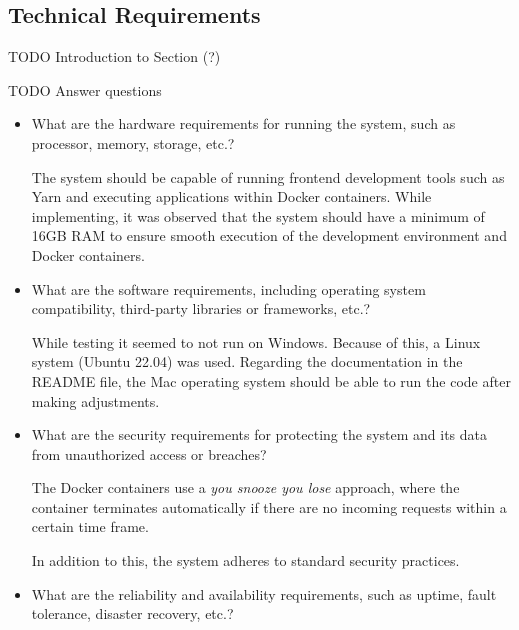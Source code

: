 \documentclass[../MasterThesis.tex]{subfiles}
\begin{document}
\subsection{Technical Requirements} \label{subsection:technicalrequirements}


TODO Introduction to Section (?)

TODO Answer questions

\begin{itemize}

\item What are the hardware requirements for running the system, such as processor, memory, storage, etc.?

The system should be capable of running frontend development tools such as Yarn and executing applications within Docker containers.
While implementing, it was observed that the system should have a minimum of 16GB RAM to ensure smooth execution of the development environment and Docker containers.



\item What are the software requirements, including operating system compatibility, third-party libraries or frameworks, etc.?

While testing it seemed to not run on Windows. Because of this, a Linux system (Ubuntu 22.04) was used. Regarding the documentation in the README file, the Mac operating system should be able to run the code after making adjustments.



\item What are the security requirements for protecting the system and its data from unauthorized access or breaches?

The Docker containers use a \textit{you snooze you lose} approach, where the container terminates automatically if there are no incoming requests within a certain time frame. 

In addition to this, the system adheres to standard security practices.



\item What are the reliability and availability requirements, such as uptime, fault tolerance, disaster recovery, etc.?


\end{itemize}
\end{document}
